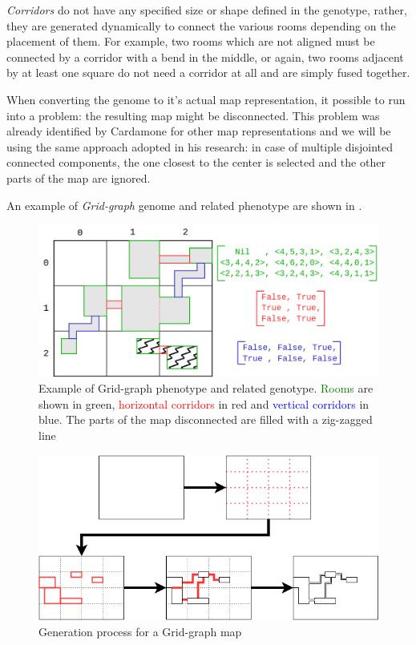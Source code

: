 \textit{Corridors} do not have any specified size or shape defined in the genotype, rather, they are generated dynamically to connect the various rooms depending on the placement of them. For example, two rooms which are not aligned must be connected by a corridor with a bend in the middle, or again, two rooms adjacent by at least one square do not need a corridor at all and are simply fused together. 

When converting the genome to it's actual map representation, it possible to run into a problem: the resulting map might be disconnected. This problem was already identified by Cardamone \cite{cardamone_evolving_maps} for other map representations and we will be using the same approach adopted in his research: in case of multiple disjointed connected components, the one closest to the center is selected and the other parts of the map are ignored.

An example of \textit{Grid-graph} genome and related phenotype are shown in .

\begin{figure}[hbtp]
\centering
\includegraphics[width=0.9\linewidth]{Images/images/Grid-graph.png}
\caption{Example of Grid-graph phenotype and related genotype. \textcolor{green}{Rooms} are shown in green, \textcolor{red}{horizontal corridors} in red and \textcolor{blue}{vertical corridors} in blue. The parts of the map disconnected are filled with a zig-zagged line}
\label{fig:grid-graph-genome-phenotype}
\end{figure}

\begin{figure}
\centering
\includegraphics[scale=0.6]{Images/images/MapGeneration.drawio.png}  
\caption{Generation process for a Grid-graph map}
\label{fig:grid-graph-generation}
\end{figure}

